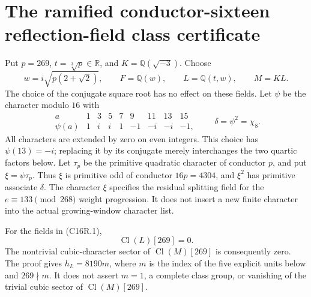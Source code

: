 \section{The ramified conductor-sixteen reflection-field class certificate}
\label{sec:cubic-conductor16-ramified-class-certificate}

Put $p=269$, $t=\sqrt[3]{p}\in\mathbb R$, and
$K=\mathbb Q(\sqrt{-3})$.  Choose
\[
 w=i\sqrt{p(2+\sqrt2)},\qquad F=\mathbb Q(w),\qquad
 L=\mathbb Q(t,w),\qquad M=KL.
 \tag{C16R.1}
\]
The choice of the conjugate square root has no effect on these fields.
Let $\psi$ be the character modulo $16$ with
\[
\begin{array}{c|rrrrrrrr}
a&1&3&5&7&9&11&13&15\\\hline
\psi(a)&1&i&i&1&-1&-i&-i&-1,
\end{array}
\qquad \delta=\psi^2=\chi_8.
\tag{C16R.2}
\]
All characters are extended by zero on even integers.  This choice
has $\psi(13)=-i$; replacing it by its conjugate merely interchanges
the two quartic factors below.
Let $\tau_p$ be the primitive quadratic character of conductor $p$,
and put $\xi=\psi\tau_p$.  Thus $\xi$ is primitive odd of
conductor $16p=4304$, and $\xi^2$ has primitive associate $\delta$.
The character $\xi$ specifies the residual splitting field for the
$e\equiv133\pmod{268}$ weight progression.  It does not insert a
new finite character into the actual growing-window character list.


\begin{theorem}
\label{AC-G144-class}
For the fields in (C16R.1),
\[
                 \operatorname{Cl}(L)[269]=0.
 \tag{C16R.3}
\]
The nontrivial cubic-character sector of
$\operatorname{Cl}(M)[269]$ is consequently zero.
The proof gives $h_L=8190m$, where $m$ is the index of the five
explicit units below and $269\nmid m$.  It does not assert
$m=1$, a complete class group, or vanishing of the trivial cubic
sector of $\operatorname{Cl}(M)[269]$.
\end{theorem}

